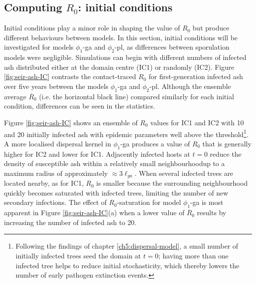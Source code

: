 \subsection{Computing $R_0$: initial conditions}

\label{section:initial-conditions}

Initial conditions play a minor role in shaping the value of $R_0$ but produce different behaviours between models. 
In this section, initial conditions will be investigated for models $\phi_1$-ga and $\phi_2$-pl, as differences between sporulation models were negligible.
Simulations can begin with different numbers of infected ash distributed either at the domain centre (IC1) or randomly (IC2).
Figure \ref{fig:seir-ash-IC} contrasts the contact-traced $R_0$ for first-generation infected ash over five years between the models $\phi_1$-ga and $\phi_2$-pl.
Although the ensemble average $\overline{R}_0$ (i.e. the horizontal black line) compared similarly for each initial condition, differences can be seen in the statistics.

Figure \ref{fig:seir-ash-IC} shows an ensemble of $R_0$ values for IC1 and IC2 with 10 and 20 initially infected ash with epidemic parameters well above the threshold\footnote{
Following the findings of chapter \ref{ch5:dispersal-model}, a small number of initially infected trees seed the domain at $t=0$; having more than one infected tree helps to reduce initial stochasticity, which thereby lowers the number of early pathogen extinction events.}.
A more localised dispersal kernel in $\phi_1$-ga produces a value of $R_0$ that is generally higher for IC2 and lower for IC1.
Adjacently infected hosts at $t=0$ reduce the density of susceptible ash within a relatively small neighbourhood\textemdash up to a maximum radius of approximately $\approx 3\ell_{ga}$.
When several infected trees are located nearby, as for IC1, $R_0$ is smaller because the surrounding neighbourhood quickly becomes saturated with infected trees, limiting the number of new secondary infections.
The effect of $R_0$-saturation for model $\phi_1$-ga is most apparent in Figure \ref{fig:seir-ash-IC}(a) when a lower value of $\overline{R}_0$ results by increasing the number of infected ash to 20.

